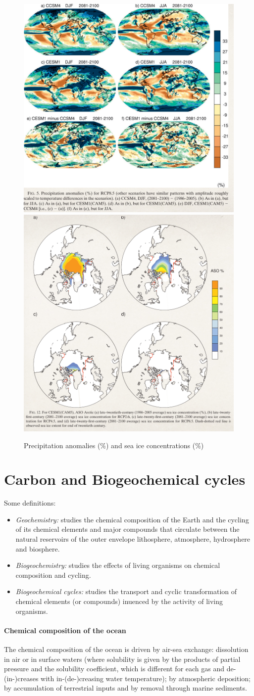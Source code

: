 \begin{figure}[htpb]
	\centering
	\includegraphics[width=0.35\linewidth]{uploads/precipitations.png}\quad \includegraphics[width=0.35\linewidth]{uploads/sea ice.png}
	\caption{Precipitation anomalies (\%) and sea ice concentrations (\%)}
	\label{fig:enter-label}
\end{figure}

\section{Carbon and Biogeochemical cycles}
Some definitions:
\begin{itemize}
	\item \textit{Geochemistry:} studies the chemical composition of the Earth and the cycling of its chemical elements and major compounds that circulate between the natural reservoirs of the outer envelope lithosphere, atmosphere, hydrosphere and biosphere.
	\item \textit{Biogeochemistry: } studies the effects of living organisms on chemical composition and cycling.
	\item \textit{Biogeochemical cycles:} studies the transport and cyclic transformation of chemical elements (or compounds) inuenced by the activity of living organisms.
\end{itemize}
\paragraph{Chemical composition of the ocean} The chemical composition of the ocean is driven by air-sea exchange: dissolution in air or in surface waters (where solubility is given by the products of partial pressure and the solubility coefficient, which is different for each gas and de-(in-)creases with in-(de-)creasing water temperature); by atmospheric deposition; by accumulation of terrestrial inputs and by removal through marine sediments.

